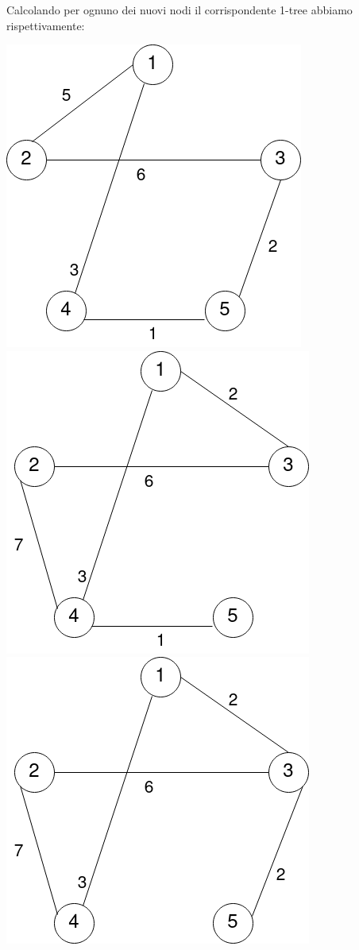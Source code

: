 \documentclass[
	article,			%
	12pt,				%
	oneside,			%
	a4paper,			%
	english,			%
	italian,				%
	sumario=tradicional,
	]{abntex2}
\begin{document}
Calcolando per ognuno dei nuovi nodi il corrispondente 1-tree abbiamo rispettivamente:
\begin{center}
    \includegraphics[scale=0.26]{files/secondo1Tree.png}
    \qquad
    \includegraphics[scale=0.26]{files/terzo1Tree.png}
    \qquad
    \includegraphics[scale=0.26]{files/quarto1Tree.png}

\end{center}
\end{document}
